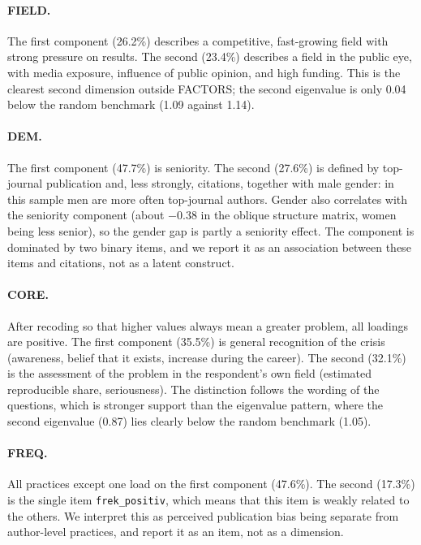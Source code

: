 \documentclass[11pt,a4paper]{article}
\newcommand{\var}[1]{\texttt{#1}}
\begin{document}
\paragraph{FIELD.} The first component (26.2\%) describes a competitive, fast-growing field with strong pressure on results. The second (23.4\%) describes a field in the public eye, with media exposure, influence of public opinion, and high funding. This is the clearest second dimension outside FACTORS; the second eigenvalue is only 0.04 below the random benchmark (1.09 against 1.14).

\paragraph{DEM.} The first component (47.7\%) is seniority. The second (27.6\%) is defined by top-journal publication and, less strongly, citations, together with male gender: in this sample men are more often top-journal authors. Gender also correlates with the seniority component (about $-0.38$ in the oblique structure matrix, women being less senior), so the gender gap is partly a seniority effect. The component is dominated by two binary items, and we report it as an association between these items and citations, not as a latent construct.

\paragraph{CORE.} After recoding so that higher values always mean a greater problem, all loadings are positive. The first component (35.5\%) is general recognition of the crisis (awareness, belief that it exists, increase during the career). The second (32.1\%) is the assessment of the problem in the respondent's own field (estimated reproducible share, seriousness). The distinction follows the wording of the questions, which is stronger support than the eigenvalue pattern, where the second eigenvalue (0.87) lies clearly below the random benchmark (1.05).

\paragraph{FREQ.} All practices except one load on the first component (47.6\%). The second (17.3\%) is the single item \var{frek\_positiv}, which means that this item is weakly related to the others. We interpret this as perceived publication bias being separate from author-level practices, and report it as an item, not as a dimension.
\end{document}
